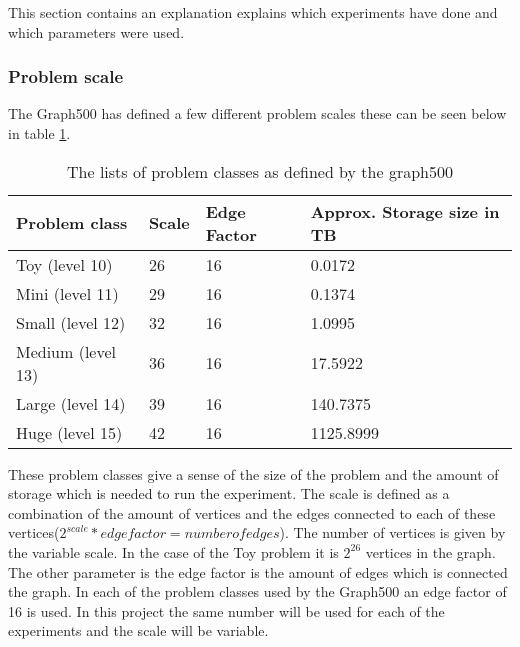 This section contains an explanation explains which experiments have done and which parameters were used.
\subsubsection{Problem scale}
The Graph500 has defined a few different problem scales these can be seen below in table \ref{tab:problem_scales}. 
\begin{table}[!h]
\begin{tabular}{|l|l|l|l|}
\hline
Problem class & Scale & Edge Factor & Approx. Storage size in TB\\ \hline
Toy (level 10) &	26 &	16 &	0.0172\\ \hline
Mini (level 11) &	29 &	16 &	0.1374\\ \hline
Small (level 12) &	32 &	16 &	1.0995\\ \hline
Medium (level 13)& 	36 &	16 &	17.5922\\ \hline
Large (level 14) &	39 &	16 &	140.7375\\ \hline
Huge (level 15) &	42 &	16 &	1125.8999\\ \hline
\end{tabular}
\caption{The lists of problem classes as defined by the graph500}
\label{tab:problem_scales}
\end{table}
These problem classes give a sense of the size of the problem and the amount of storage which is needed to run the experiment. The scale is defined as a combination of the amount of vertices and the edges connected to each of these vertices($2^{scale} * edgefactor = number of edges$). The number of vertices is given by the variable scale. In the case of the Toy  problem it is $2^26$ vertices in the graph. The other parameter is the edge factor is the amount of edges which is connected the graph. In each of the problem classes used by the Graph500 an edge factor of 16 is used. In this project the same number will be used for each of the experiments and the scale will be variable. 






